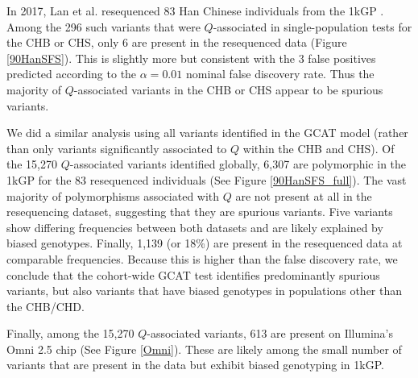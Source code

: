 \documentclass[9pt,article]{template}
\begin{document}
In 2017, Lan et al. resequenced 83 Han Chinese individuals from the 1kGP \citep{Lan2017}. 
Among the 296 such variants that were $Q$-associated in single-population tests for the CHB or CHS, only 6 are present in the resequenced data (Figure \ref{90HanSFS}).   
This is slightly more but consistent with the 3 false positives predicted according to the $\alpha = 0.01$ nominal false discovery rate. 
Thus the majority of $Q$-associated variants in the CHB or CHS  appear to be spurious variants. 

We did a similar analysis using all variants identified in the GCAT model (rather than only variants significantly associated to $Q$ within the CHB and CHS). 
Of the 15,270 $Q$-associated variants identified globally, 6,307 are polymorphic in the 1kGP for the 83 resequenced individuals  (See Figure \ref{90HanSFS_full}).
The vast majority of polymorphisms associated with $Q$ are not present at all in the resequencing dataset, suggesting that they are spurious variants.
Five variants show differing frequencies between both datasets and are likely explained by biased genotypes.
Finally, 1,139 (or 18\%) are present in the resequenced data at comparable frequencies.
Because this is higher than the false discovery rate, we conclude that the cohort-wide GCAT test identifies predominantly spurious variants, but also variants that have biased genotypes in populations other than the CHB/CHD. 

Finally, among the 15,270 $Q$-associated variants, 613 are present on Illumina's Omni 2.5 chip (See Figure \ref{Omni}). 
These are likely among the small number of variants that are present in the data but exhibit biased genotyping in 1kGP. 
\end{document}
